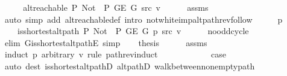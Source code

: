 \begin{isabellebody}
\ {\isacharminus}{\kern0pt}\isanewline
\ \ \isamarkupfalse%
\ {\isachardoublequoteopen}alt{\isacharunderscore}{\kern0pt}reachable\ P{\isacharprime}{\kern0pt}{\isacharprime}{\kern0pt}\ {\isacharparenleft}{\kern0pt}Not\ {\isasymcirc}\ P{\isacharprime}{\kern0pt}{\isacharprime}{\kern0pt}{\isacharparenright}{\kern0pt}\ {\isacharparenleft}{\kern0pt}G{\isachardot}{\kern0pt}E\ G{\isacharparenright}{\kern0pt}\ src\ v{\isachardoublequoteclose}\isanewline
\ \ \ \ \isamarkupfalse%
\ assms\isanewline
\ \ \ \ \isamarkupfalse%
\ {\isacharparenleft}{\kern0pt}auto\ simp\ add{\isacharcolon}{\kern0pt}\ alt{\isacharunderscore}{\kern0pt}reachable{\isacharunderscore}{\kern0pt}def\ intro{\isacharcolon}{\kern0pt}\ not{\isacharunderscore}{\kern0pt}white{\isacharunderscore}{\kern0pt}imp{\isacharunderscore}{\kern0pt}alt{\isacharunderscore}{\kern0pt}path{\isacharunderscore}{\kern0pt}rev{\isacharunderscore}{\kern0pt}follow{\isacharparenright}{\kern0pt}\isanewline
\ \ \isamarkupfalse%
\ \isamarkupfalse%
\ p\ \isanewline
\ \ \ \ {\isachardoublequoteopen}is{\isacharunderscore}{\kern0pt}shortest{\isacharunderscore}{\kern0pt}alt{\isacharunderscore}{\kern0pt}path\ P{\isacharprime}{\kern0pt}{\isacharprime}{\kern0pt}\ {\isacharparenleft}{\kern0pt}Not\ {\isasymcirc}\ P{\isacharprime}{\kern0pt}{\isacharprime}{\kern0pt}{\isacharparenright}{\kern0pt}\ {\isacharparenleft}{\kern0pt}G{\isachardot}{\kern0pt}E\ G{\isacharparenright}{\kern0pt}\ p\ src\ v{\isachardoublequoteclose}\isanewline
\ \ \ \ \isamarkupfalse%
\ no{\isacharunderscore}{\kern0pt}odd{\isacharunderscore}{\kern0pt}cycle\isanewline
\ \ \ \ \isamarkupfalse%
\ {\isacharparenleft}{\kern0pt}elim\ G{\isachardot}{\kern0pt}is{\isacharunderscore}{\kern0pt}shortest{\isacharunderscore}{\kern0pt}alt{\isacharunderscore}{\kern0pt}pathE{\isacharparenright}{\kern0pt}\ simp{\isacharplus}{\kern0pt}\isanewline
\ \ \isamarkupfalse%
\ {\isacharquery}{\kern0pt}thesis\isanewline
\ \ \ \ \isamarkupfalse%
\ assms\isanewline
\ \ \isamarkupfalse%
\ {\isacharparenleft}{\kern0pt}induct\ p\ arbitrary{\isacharcolon}{\kern0pt}\ v\ rule{\isacharcolon}{\kern0pt}\ path{\isacharunderscore}{\kern0pt}rev{\isacharunderscore}{\kern0pt}induct{\isacharparenright}{\kern0pt}\isanewline
\ \ \ \ \isamarkupfalse%
\ {}\isanewline
\ \ \ \ \isamarkupfalse%
\ {\isacharquery}{\kern0pt}case\isanewline
\ \ \ \ \ \ \isamarkupfalse%
\ {\isacharparenleft}{\kern0pt}auto\ dest{\isacharcolon}{\kern0pt}\ is{\isacharunderscore}{\kern0pt}shortest{\isacharunderscore}{\kern0pt}alt{\isacharunderscore}{\kern0pt}pathD{\isacharparenleft}{\kern0pt}{}{\isacharparenright}{\kern0pt}\ alt{\isacharunderscore}{\kern0pt}pathD{\isacharparenleft}{\kern0pt}{}{\isacharparenright}{\kern0pt}\ walk{\isacharunderscore}{\kern0pt}between{\isacharunderscore}{\kern0pt}nonempty{\isacharunderscore}{\kern0pt}path{\isacharparenleft}{\kern0pt}{}{\isacharparenright}{\kern0pt}{\isacharparenright}{\kern0pt}\isanewline

\end{isabellebody}
